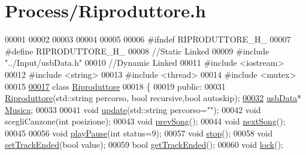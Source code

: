 \hypertarget{Riproduttore_8h_source}{\section{\-Process/\-Riproduttore.h}
}

\begin{DoxyCode}
00001 
00002 
00003 
00004 
00005 
00006 \textcolor{preprocessor}{#ifndef RIPRODUTTORE\_H\_}
00007 \textcolor{preprocessor}{}\textcolor{preprocessor}{#define RIPRODUTTORE\_H\_}
00008 \textcolor{preprocessor}{}\textcolor{comment}{//Static Linked}
00009 \textcolor{preprocessor}{#include "../Input/usbData.h"}
00010 \textcolor{comment}{//Dynamic Linked}
00011 \textcolor{preprocessor}{#include <iostream>}
00012 \textcolor{preprocessor}{#include <string>}
00013 \textcolor{preprocessor}{#include <thread>}           
00014 \textcolor{preprocessor}{#include <mutex>}            
00015 
\hypertarget{Riproduttore_8h_source_l00017}{}\hyperlink{classRiproduttore}{00017} \textcolor{keyword}{class }\hyperlink{classRiproduttore}{Riproduttore}
00018 \{
00019 \textcolor{keyword}{public}:
00031     \hyperlink{classRiproduttore_ab01a4e52bcc2735e94f547b32906f3a2}{Riproduttore}(std::string percorso, \textcolor{keywordtype}{bool} recursive,\textcolor{keywordtype}{bool} autoskip);
\hypertarget{Riproduttore_8h_source_l00032}{}\hyperlink{classRiproduttore_a373b2d6675abc22dbe61abf2223cacab}{00032}     \hyperlink{classusbData}{usbData}* \hyperlink{classRiproduttore_a373b2d6675abc22dbe61abf2223cacab}{Musica}; 
00033 
00041     \textcolor{keywordtype}{void} \hyperlink{classRiproduttore_ae264ca70ff75d625fb9d41e8117cd800}{update}(std::string percorso=\textcolor{stringliteral}{""});
00042     \textcolor{keywordtype}{void} scegliCanzone(\textcolor{keywordtype}{int} posizione);
00043     \textcolor{keywordtype}{void} \hyperlink{classRiproduttore_a6bb45ff25c5a3b9ffcf9203214f13340}{prevSong}(); 
00044     \textcolor{keywordtype}{void} \hyperlink{classRiproduttore_ab8a211727d84256bc62ab841881ee9c3}{nextSong}(); 
00045 
00056     \textcolor{keywordtype}{void} \hyperlink{classRiproduttore_a0e1a448f370d517dbe2ed75f1f097abf}{playPause}(\textcolor{keywordtype}{int} status=9);
00057     \textcolor{keywordtype}{void} \hyperlink{classRiproduttore_a837bea01fa68487694b661ec94781f5d}{stop}(); 
00058     \textcolor{keywordtype}{void} \hyperlink{classRiproduttore_aafc3cf55f8a95cfc5e3779294184db8b}{setTrackEnded}(\textcolor{keywordtype}{bool} value); 
00059     \textcolor{keywordtype}{bool} \hyperlink{classRiproduttore_abf360eff47ce41b498b6d66672225929}{getTrackEnded}(); 
00060     \textcolor{keywordtype}{void} \hyperlink{classRiproduttore_a87c1d5e97b54d0d4abbd5465adeb7c10}{lock}(); 

\end{DoxyCode}
